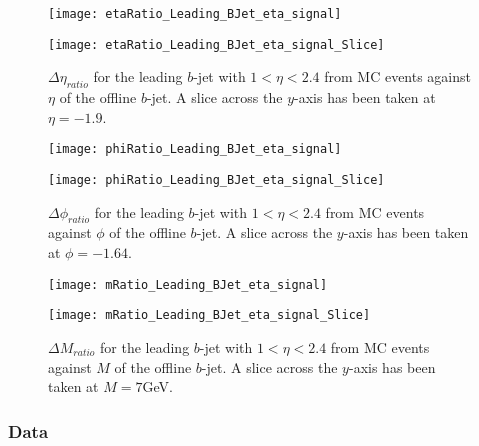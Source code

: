 	\begin{figure}[h]
		\centering

		\begin{minipage}[h]{0.33\linewidth}
			\texttt{[image: etaRatio\_Leading\_BJet\_eta\_signal]}
		\end{minipage}
		\quad
		\begin{minipage}[h]{0.33\linewidth}
			\texttt{[image: etaRatio\_Leading\_BJet\_eta\_signal\_Slice]}
		\end{minipage}
		\caption{$\Delta \eta_{ratio}$ for the leading \pt $b$-jet with $1 < \eta < 2.4$ from MC events against $\eta$ of the offline $b$-jet. A slice across the $y$-axis has been taken at $\eta=-1.9$. }
		\label{fig:MC:leadingbetacore}
	\end{figure}

	\begin{figure}[h]
		\centering

		\begin{minipage}[h]{0.33\linewidth}
			\texttt{[image: phiRatio\_Leading\_BJet\_eta\_signal]}
		\end{minipage}
		\quad
		\begin{minipage}[h]{0.33\linewidth}
			\texttt{[image: phiRatio\_Leading\_BJet\_eta\_signal\_Slice]}
		\end{minipage}
		\caption{$\Delta \phi_{ratio}$ for the leading \pt $b$-jet with $1 < \eta < 2.4$ from MC events against $\phi$ of the offline $b$-jet. A slice across the $y$-axis has been taken at $\phi=-1.64$. }
		\label{fig:MC:leadingbphicore}
	\end{figure}

	\begin{figure}[h]
		\centering

		\begin{minipage}[h]{0.33\linewidth}
			\texttt{[image: mRatio\_Leading\_BJet\_eta\_signal]}
		\end{minipage}
		\quad
		\begin{minipage}[h]{0.33\linewidth}
			\texttt{[image: mRatio\_Leading\_BJet\_eta\_signal\_Slice]}
		\end{minipage}
		\caption{$\Delta M_{ratio}$ for the leading \pt $b$-jet with $1 < \eta < 2.4$ from MC events against $M$ of the offline $b$-jet. A slice across the $y$-axis has been taken at $M=7$GeV. }
		\label{fig:MC:leadingbmcore}
	\end{figure}

	\subsubsection{Data}

